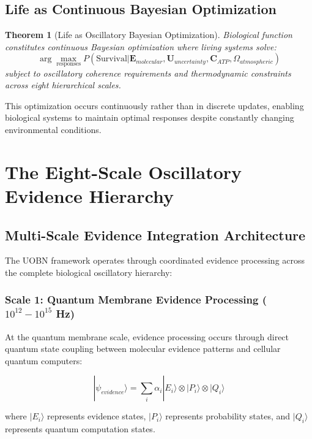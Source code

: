 \documentclass[12pt,a4paper]{article}
\newtheorem{theorem}{Theorem}[section]
\begin{document}
\subsection{Life as Continuous Bayesian Optimization}

\begin{theorem}[Life as Oscillatory Bayesian Optimization]
Biological function constitutes continuous Bayesian optimization where living systems solve:
\begin{equation}
\arg\max_{\text{responses}} P(\text{Survival} | \mathbf{E}_{molecular}, \mathbf{U}_{uncertainty}, \mathbf{C}_{ATP}, \Omega_{atmospheric})
\end{equation}
subject to oscillatory coherence requirements and thermodynamic constraints across eight hierarchical scales.
\end{theorem}

This optimization occurs continuously rather than in discrete updates, enabling biological systems to maintain optimal responses despite constantly changing environmental conditions.

\section{The Eight-Scale Oscillatory Evidence Hierarchy}

\subsection{Multi-Scale Evidence Integration Architecture}

The UOBN framework operates through coordinated evidence processing across the complete biological oscillatory hierarchy:

\subsubsection{Scale 1: Quantum Membrane Evidence Processing ($10^{12}-10^{15}$ Hz)}

At the quantum membrane scale, evidence processing occurs through direct quantum state coupling between molecular evidence patterns and cellular quantum computers:

\begin{equation}
|\psi_{evidence}\rangle = \sum_i \alpha_i |E_i\rangle \otimes |P_i\rangle \otimes |Q_i\rangle
\end{equation}

where $|E_i\rangle$ represents evidence states, $|P_i\rangle$ represents probability states, and $|Q_i\rangle$ represents quantum computation states.
\end{document}
